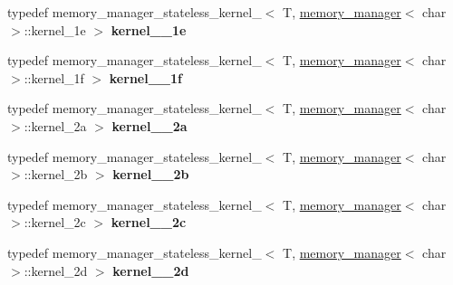 \begin{DoxyCompactItemize}
\item 
\hypertarget{classdlib_1_1memory__manager__stateless_a98d0742a308d5a4c39bea3f8d813a68d}{
typedef memory\_\-manager\_\-stateless\_\-kernel\_$<$ T, \hyperlink{classdlib_1_1memory__manager}{memory\_\-manager}$<$ char $>$::kernel\_\-1e $>$ {\bfseries kernel\_\_\-1e}}
\label{classdlib_1_1memory__manager__stateless_a98d0742a308d5a4c39bea3f8d813a68d}

\item 
\hypertarget{classdlib_1_1memory__manager__stateless_a8e959fe46c58dfe9dd046017248cfc3e}{
typedef memory\_\-manager\_\-stateless\_\-kernel\_$<$ T, \hyperlink{classdlib_1_1memory__manager}{memory\_\-manager}$<$ char $>$::kernel\_\-1f $>$ {\bfseries kernel\_\_\-1f}}
\label{classdlib_1_1memory__manager__stateless_a8e959fe46c58dfe9dd046017248cfc3e}

\item 
\hypertarget{classdlib_1_1memory__manager__stateless_a04e3aa8895b799637bca4309010e0d8a}{
typedef memory\_\-manager\_\-stateless\_\-kernel\_$<$ T, \hyperlink{classdlib_1_1memory__manager}{memory\_\-manager}$<$ char $>$::kernel\_\-2a $>$ {\bfseries kernel\_\_\-2a}}
\label{classdlib_1_1memory__manager__stateless_a04e3aa8895b799637bca4309010e0d8a}

\item 
\hypertarget{classdlib_1_1memory__manager__stateless_a148c2031ba99e5622ed527c8225a6a50}{
typedef memory\_\-manager\_\-stateless\_\-kernel\_$<$ T, \hyperlink{classdlib_1_1memory__manager}{memory\_\-manager}$<$ char $>$::kernel\_\-2b $>$ {\bfseries kernel\_\_\-2b}}
\label{classdlib_1_1memory__manager__stateless_a148c2031ba99e5622ed527c8225a6a50}

\item 
\hypertarget{classdlib_1_1memory__manager__stateless_a022a9e25199b8ad62ba6c8f090b3979e}{
typedef memory\_\-manager\_\-stateless\_\-kernel\_$<$ T, \hyperlink{classdlib_1_1memory__manager}{memory\_\-manager}$<$ char $>$::kernel\_\-2c $>$ {\bfseries kernel\_\_\-2c}}
\label{classdlib_1_1memory__manager__stateless_a022a9e25199b8ad62ba6c8f090b3979e}

\item 
\hypertarget{classdlib_1_1memory__manager__stateless_acbdd0838ac78992cdc8e9b1846e6c837}{
typedef memory\_\-manager\_\-stateless\_\-kernel\_$<$ T, \hyperlink{classdlib_1_1memory__manager}{memory\_\-manager}$<$ char $>$::kernel\_\-2d $>$ {\bfseries kernel\_\_\-2d}}
\label{classdlib_1_1memory__manager__stateless_acbdd0838ac78992cdc8e9b1846e6c837}


\end{DoxyCompactItemize}

